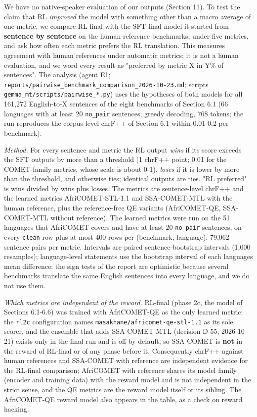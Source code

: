 We have no native-speaker evaluation of our outputs (Section 11). To test the claim that RL \emph{improved} the model with something other than a macro average of one metric, we compare RL-final with the SFT-final model it started from \textbf{sentence by sentence} on the human-reference benchmarks, under five metrics, and ask how often each metric prefers the RL translation. This measures agreement with human references under automatic metrics; it is not a human evaluation, and we word every result as "preferred by metric X in Y\% of sentences". The analysis (agent E1; \texttt{reports/pairwise\_benchmark\_comparison\_2026-10-23.md}; scripts \texttt{gemma\_mt/scripts/pairwise\_*.py}) uses the hypotheses of both models for all 161,272 English-to-X sentences of the eight benchmarks of Section 6.1 (66 languages with at least 20 \texttt{no\_pair} sentences; greedy decoding, 768 tokens; the run reproduces the corpus-level chrF++ of Section 6.1 within 0.01-0.2 per benchmark).

\emph{Method.} For every sentence and metric the RL output \emph{wins} if its score exceeds the SFT output\textquotesingle s by more than a threshold (1 chrF++ point; 0.01 for the COMET-family metrics, whose scale is about 0-1), \emph{loses} if it is lower by more than the threshold, and otherwise ties; identical outputs are ties. "RL preferred" is wins divided by wins plus losses. The metrics are sentence-level chrF++ and the learned metrics AfriCOMET-STL-1.1 and SSA-COMET-MTL with the human reference, plus the reference-free QE variants (AfriCOMET-QE, SSA-COMET-MTL without reference). The learned metrics were run on the 51 languages that AfriCOMET covers and have at least 20 \texttt{no\_pair} sentences, on every \texttt{clean} row plus at most 400 rows per (benchmark, language): 79,062 sentence pairs per metric. Intervals are paired sentence-bootstrap intervals (1,000 resamples); language-level statements use the bootstrap interval of each language\textquotesingle s mean difference; the sign tests of the report are optimistic because several benchmarks translate the same English sentences into every language, and we do not use them.

\emph{Which metrics are independent of the reward.} RL-final (phase 2c, the model of Sections 6.1-6.6) was trained with AfriCOMET-QE as the only learned metric: the \texttt{rl2c} configuration names \texttt{masakhane/africomet-qe-stl-1.1} as its sole scorer, and the ensemble that adds SSA-COMET-MTL (decision D-55, 2026-10-21) exists only in the final run and is off by default, so SSA-COMET is \textbf{not} in the reward of RL-final or of any phase before it. Consequently chrF++ against human references and SSA-COMET with reference are independent evidence for the RL-final comparison; AfriCOMET with reference shares its model family (encoder and training data) with the reward model and is not independent in the strict sense, and the QE metrics are the reward model itself or its sibling. The AfriCOMET-QE reward model also appears in the table, as a check on reward hacking.

